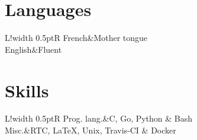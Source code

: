 \documentclass[14pt,a4paper]{article}
\newcommand\VRule{\color{lightgray}\vrule width 0.5pt}
\begin{document}
\section*{Languages}
\begin{tabular}{L!{\VRule}R}
French&Mother tongue\\[3pt]
English&Fluent\\
\end{tabular}

\section*{Skills}
\begin{tabular}{L!{\VRule}R}
Prog. lang.&C, Go, Python \& Bash\\
Misc.&RTC, LaTeX, Unix, Travis-CI \& Docker
\end{tabular}
\end{document}
